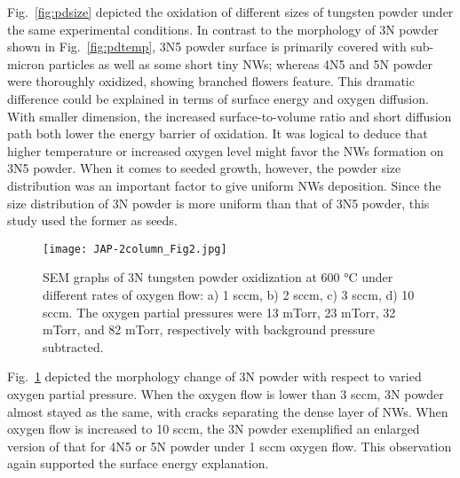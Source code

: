 Fig.~\ref{fig:pdsize} depicted the oxidation of different sizes of tungsten powder under the same experimental conditions. In contrast to the morphology of 3N powder shown in Fig.~\ref{fig:pdtemp}, 3N5 powder surface is primarily covered with sub-micron particles as well as some short tiny NWs; whereas 4N5 and 5N powder were thoroughly oxidized, showing branched flowers feature. This dramatic difference could be explained in terms of surface energy and oxygen diffusion. With smaller dimension, the increased surface-to-volume ratio and short diffusion path both lower the energy barrier of oxidation.\cite{tungsten1999} It was logical to deduce that higher temperature or increased oxygen level might favor the NWs formation on 3N5 powder. When it comes to seeded growth, however, the powder size distribution was an important factor to give uniform NWs deposition. Since the size distribution of 3N powder is more uniform than that of 3N5 powder, this study used the former as seeds.
\begin{figure}[htb]
\centering
\texttt{[image: JAP-2column\_Fig2.jpg]}
\caption[W powder oxidation: oxygen pressure]{SEM graphs of 3N tungsten powder oxidization at 600 \si{\degreeCelsius} under different rates of oxygen flow: a) 1 sccm, b) 2 sccm, c) 3 sccm, d) 10 sccm. The oxygen partial pressures were 13 mTorr, 23 mTorr, 32 mTorr, and 82 mTorr, respectively with background pressure subtracted.}
\label{fig:pdoxy}
\end{figure}

Fig.~\ref{fig:pdoxy} depicted the morphology change of 3N powder with respect to varied oxygen partial pressure. When the oxygen flow is lower than 3 sccm, 3N powder almost stayed as the same, with cracks separating the dense layer of NWs. When oxygen flow is increased to 10 sccm, the 3N powder exemplified an enlarged version of that for 4N5 or 5N powder under 1 sccm oxygen flow. This observation again supported the surface energy explanation.

